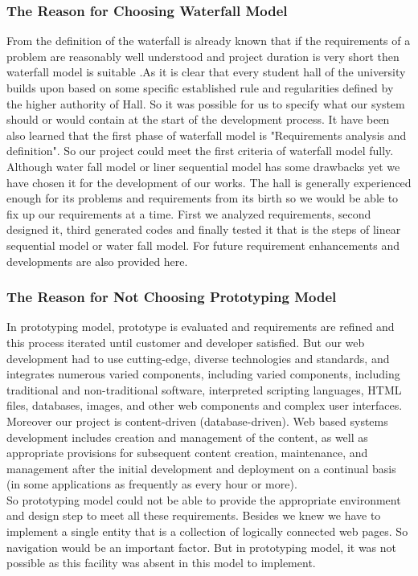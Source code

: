 \subsubsection{The Reason for Choosing Waterfall Model\newline}
From the definition of the waterfall is already known that if the
requirements of a problem are reasonably well understood and
project duration is very short then waterfall model is suitable
.As it is clear that every student hall of the university builds
upon based on some specific established rule and regularities
defined by the higher authority of Hall. So it was possible for us
to specify what our system should or would contain at the start of
the development process. It have been also learned that the first
phase of waterfall model is "Requirements analysis and
definition". So our project could meet the first criteria of
waterfall model fully. Although water fall model or liner
sequential model has some drawbacks yet we have chosen it for the
development of our works. The hall is generally experienced enough
for its problems and requirements from its birth so we would be
able to fix up our requirements at a time. First we analyzed
requirements, second designed it, third generated codes and
finally tested it that is the steps of linear sequential model or
water fall model. For future requirement enhancements and
developments are also provided here.

\subsubsection{ The Reason for Not Choosing Prototyping
Model\newline}
 In prototyping model, prototype is evaluated and
requirements are refined and this process iterated until customer
and developer satisfied. But our web development had to use
cutting-edge, diverse technologies and standards, and integrates
numerous varied components, including varied components, including
traditional and non-traditional software, interpreted scripting
languages, HTML files, databases, images, and other web components
and complex user interfaces. Moreover our project is
content-driven (database-driven). Web based systems development
includes creation and management of the content, as well as
appropriate provisions for subsequent content creation,
maintenance, and management after the initial development and
deployment on a continual basis (in some applications as
frequently as every hour or more).\\
So prototyping model could not be able to provide the appropriate
environment and design step to meet all these requirements.
Besides we knew we have to implement a single entity that is a
collection of logically connected web pages. So navigation would
be an important factor. But in prototyping model, it was not
possible as this facility was absent in this model to implement.

